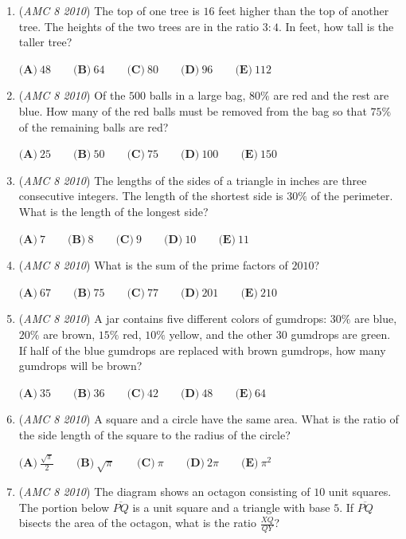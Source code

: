 \begin{enumerate}
	\item (\textit{AMC 8 2010}) The top of one tree is $16$ feet higher than the top of another tree. The heights of the two trees are in the ratio $3:4$. In feet, how tall is the taller tree? 


 $\textbf{(A)}\ 48 \qquad\textbf{(B)}\ 64 \qquad\textbf{(C)}\ 80 \qquad\textbf{(D)}\ 96\qquad\textbf{(E)}\ 112$


	\item (\textit{AMC 8 2010}) Of the $500$ balls in a large bag, $80\%$ are red and the rest are blue. How many of the red balls must be removed from the bag so that $75\%$ of the remaining balls are red?


 $\textbf{(A)}\ 25 \qquad\textbf{(B)}\ 50 \qquad\textbf{(C)}\ 75 \qquad\textbf{(D)}\ 100\qquad\textbf{(E)}\ 150$


	\item (\textit{AMC 8 2010}) The lengths of the sides of a triangle in inches are three consecutive integers. The length of the shortest side is $30\%$ of the perimeter. What is the length of the longest side?


 $\textbf{(A)}\ 7 \qquad\textbf{(B)}\ 8\qquad\textbf{(C)}\ 9\qquad\textbf{(D)}\ 10\qquad\textbf{(E)}\ 11$


	\item (\textit{AMC 8 2010}) What is the sum of the prime factors of $2010$? 


 $\textbf{(A)}\ 67 \qquad\textbf{(B)}\ 75\qquad\textbf{(C)}\ 77\qquad\textbf{(D)}\ 201\qquad\textbf{(E)}\ 210$


	\item (\textit{AMC 8 2010}) A jar contains five different colors of gumdrops: $30\%$ are blue, $20\%$ are brown, $15\%$ red, $10\%$ yellow, and the other $30$ gumdrops are green. If half of the blue gumdrops are replaced with brown gumdrops, how many gumdrops will be brown?


 $\textbf{(A)}\ 35 \qquad\textbf{(B)}\ 36\qquad\textbf{(C)}\ 42\qquad\textbf{(D)}\ 48\qquad\textbf{(E)}\ 64$


	\item (\textit{AMC 8 2010}) A square and a circle have the same area. What is the ratio of the side length of the square to the radius of the circle? 


 $\textbf{(A)}\  \frac{\sqrt{\pi}}{2}  \qquad\textbf{(B)}\ \sqrt{\pi} \qquad\textbf{(C)}\ \pi \qquad\textbf{(D)}\ 2\pi \qquad\textbf{(E)}\ \pi^{2}$


	\item (\textit{AMC 8 2010}) The diagram shows an octagon consisting of $10$ unit squares. The portion below $\overline{PQ}$ is a unit square and a triangle with base $5$. If $\overline{PQ}$ bisects the area of the octagon, what is the ratio $\frac{XQ}{QY}$?



\end{enumerate}
